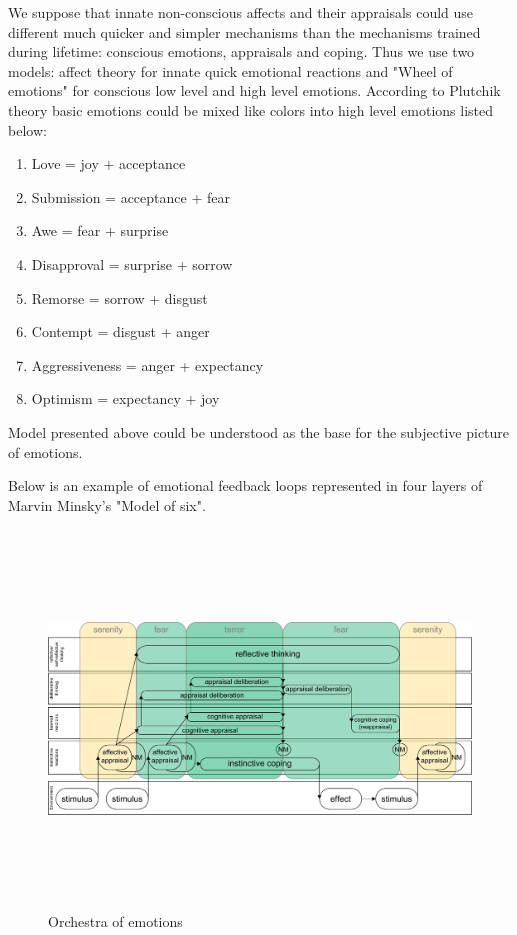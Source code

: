 We suppose that innate non-conscious affects and their appraisals could use different much quicker and simpler mechanisms than the mechanisms trained during lifetime: conscious emotions, appraisals and coping. Thus we use two models: affect theory for innate quick emotional reactions and "Wheel of emotions" for conscious low level and high level emotions. According to Plutchik theory basic emotions could be mixed like colors into high level emotions listed below:

\begin{enumerate}
 \item  Love = joy + acceptance
 \item  Submission = acceptance + fear
 \item  Awe = fear + surprise
 \item  Disapproval = surprise + sorrow
 \item  Remorse = sorrow + disgust
 \item  Contempt = disgust + anger
 \item  Aggressiveness = anger + expectancy
 \item  Optimism = expectancy + joy
\end{enumerate}

Model presented above could be understood as the base for the subjective picture of emotions.

Below is an example of emotional feedback loops \cite{natureofemotions} represented in four layers of Marvin Minsky's "Model of six".

\begin{figure}
\begin{center}
 \includegraphics[height=10cm, angle=90]{figure2_orchestra_of_emotions}
\end{center}
\caption{Orchestra of emotions}
\end{figure}

